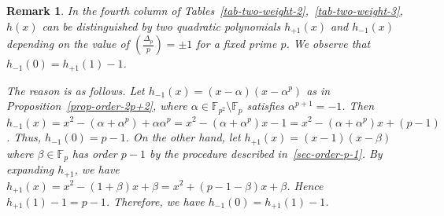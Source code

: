 \documentclass[12pt,reqno]{amsart}
\newtheorem{rem}{Remark}
\newcommand{\F}{\mathbb{F}}
\begin{document}
\begin{rem}{\rm
In the fourth column of Tables~\ref{tab-two-weight-2},~\ref{tab-two-weight-3}, $h(x)$ can be distinguished by two quadratic polynomials $h_{+1}(x)$ and $h_{-1}(x)$ depending on the value of
$(\frac{\Delta_p}{p})= \pm 1$ for a fixed prime $p$. We observe that $h_{-1}(0) = h_{+1}(1) -1$.

The reason is as follows.
Let $h_{-1}(x)= (x- \alpha)(x- \alpha^p)$ as in Proposition~\ref{prop-order-2p+2}, where  $\alpha \in \F_{p^2}\setminus \F_p$ satisfies $\alpha^{p+1}=-1$. Then $h_{-1}(x)= x^2 - (\alpha + \alpha^p) + \alpha \alpha^p = x^2 -(\alpha + \alpha^p)x  -1 =  x^2 -(\alpha + \alpha^p)x + (p-1)$. Thus, $h_{-1}(0)= p-1$. On the other hand, let $h_{+1}(x) = (x-1)(x-\beta)$ where $\beta \in \F_p$ has order $p-1$ by the procedure described in~\ref{sec-order-p-1}. By expanding $h_{+1}$, we have $h_{+1}(x) = x^2 - (1 + \beta)x + \beta = x^2 + (p-1 - \beta)x + \beta $. Hence $h_{+1}(1)-1 =p-1$. Therefore, we have $h_{-1}(0) = h_{+1}(1) -1$.
}
\end{rem}
\end{document}
